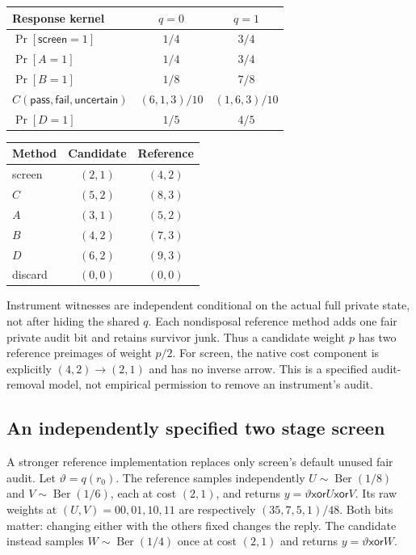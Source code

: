 \begin{center}
\begin{tabular}{@{}lcc@{}}
\toprule Response kernel&$q=0$&$q=1$\\\midrule
$\Pr[\mathsf{screen}=1]$&$1/4$&$3/4$\\
$\Pr[A=1]$&$1/4$&$3/4$\\
$\Pr[B=1]$&$1/8$&$7/8$\\
$C(\mathsf{pass},\mathsf{fail},\mathsf{uncertain})$&$(6,1,3)/10$&$(1,6,3)/10$\\
$\Pr[D=1]$&$1/5$&$4/5$\\
\bottomrule
\end{tabular}
\end{center}
\begin{center}
\begin{tabular}{@{}lcc@{}}
\toprule Method&Candidate&Reference\\\midrule
screen&$(2,1)$&$(4,2)$\\
$C$&$(5,2)$&$(8,3)$\\
$A$&$(3,1)$&$(5,2)$\\
$B$&$(4,2)$&$(7,3)$\\
$D$&$(6,2)$&$(9,3)$\\
discard&$(0,0)$&$(0,0)$\\
\bottomrule
\end{tabular}
\end{center}
Instrument witnesses are independent conditional on the actual full
private state, not after hiding the shared $q$. Each nondisposal reference
method adds one fair private audit bit and retains survivor junk. Thus
a candidate weight $p$ has two reference preimages of weight $p/2$.
For screen, the native cost component is explicitly
$(4,2)\to(2,1)$ and has no inverse arrow. This is a specified audit-removal
model, not empirical permission to remove an instrument's audit.

\subsection{An independently specified two stage screen}
A stronger reference implementation replaces only screen's default
unused fair audit. Let $\vartheta=q(r_0)$. The reference samples
independently $U\sim\operatorname{Ber}(1/8)$ and
$V\sim\operatorname{Ber}(1/6)$, each at cost $(2,1)$, and returns
$y=\vartheta\mathbin{\mathsf{xor}}U\mathbin{\mathsf{xor}}V$.
Its raw weights at $(U,V)=00,01,10,11$ are respectively
$(35,7,5,1)/48$. Both bits matter: changing either with the others
fixed changes the reply. The candidate instead samples
$W\sim\operatorname{Ber}(1/4)$ once at cost $(2,1)$ and returns
$y=\vartheta\mathbin{\mathsf{xor}}W$.

